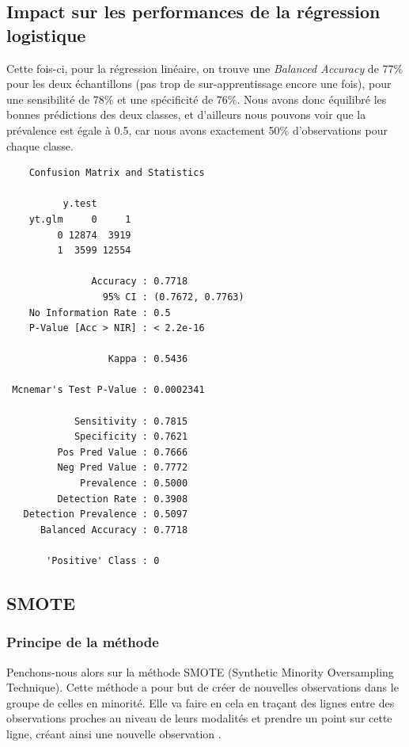 \documentclass{article}
\begin{document}
\subsection{Impact sur les performances de la régression logistique}

Cette fois-ci, pour la régression linéaire, on trouve une \emph{Balanced Accuracy} de 77\% pour les deux échantillons (pas trop de sur-apprentissage encore une fois), pour une sensibilité de 78\% et une spécificité de 76\%. Nous avons donc équilibré les bonnes prédictions des deux classes, et d'ailleurs nous pouvons voir que la prévalence est égale à 0.5, car nous avons exactement 50\% d'observations pour chaque classe. 

    \begin{verbatim}
    Confusion Matrix and Statistics

          y.test
    yt.glm     0     1
         0 12874  3919
         1  3599 12554

               Accuracy : 0.7718          
                 95% CI : (0.7672, 0.7763)
    No Information Rate : 0.5             
    P-Value [Acc > NIR] : < 2.2e-16       

                  Kappa : 0.5436 

 Mcnemar's Test P-Value : 0.0002341       

            Sensitivity : 0.7815          
            Specificity : 0.7621          
         Pos Pred Value : 0.7666          
         Neg Pred Value : 0.7772          
             Prevalence : 0.5000          
         Detection Rate : 0.3908          
   Detection Prevalence : 0.5097          
      Balanced Accuracy : 0.7718          

       'Positive' Class : 0
    \end{verbatim}

\subsection{SMOTE}

\subsubsection{Principe de la méthode}

Penchons-nous alors sur la méthode SMOTE (Synthetic Minority Oversampling Technique). Cette méthode a pour but de créer de nouvelles observations dans le groupe de celles en minorité. Elle va faire en cela en traçant des lignes entre des observations proches au niveau de leurs modalités et prendre un point sur cette ligne, créant ainsi une nouvelle observation \cite{smote}. 
\end{document}
